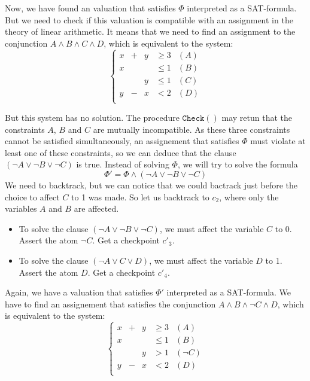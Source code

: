 \documentclass{article}
\newcommand{\icheck}{\mathtt{Check}()}
\begin{document}
Now, we have found an valuation that satisfies $\Phi$ interpreted as a
SAT-formula. But we need to check if this valuation is compatible with an
assignment in the theory of linear arithmetic. It means that we need to find an
assignment to the conjunction $A \wedge B \wedge C \wedge D$, which is equivalent
to the system:
\begin{displaymath}
  \left\{
  \begin{array}{ccccr}
    x  & + & y & \geqslant 3 & (A) \\
    x  &   &   & \leqslant 1 & (B) \\
       &   & y & \leqslant 1 & (C) \\
    y  & - & x & < 2         & (D) \\
  \end{array}
  \right.
\end{displaymath}

But this system has no solution. The procedure $\icheck$ may retun that the
constraints $A$, $B$ and $C$ are mutually incompatible. As these three
constraints cannot be satisfied simultaneously, an assignement that satisfies
$\Phi$ must violate at least one of these constraints, so we can deduce that
the clause $(\neg A \vee \neg B \vee \neg C)$ is true. Instead of solving
$\Phi$, we will try to solve the formula
$$\Phi' = \Phi \wedge (\neg A \vee \neg B \vee \neg C)$$
We need to backtrack, but we can notice that we could bactrack just before
the choice to affect $C$ to 1 was made. So let us backtrack to $c_2$, where
only the variables $A$ and $B$ are affected.

\begin{itemize}
  \item To solve the clause $(\neg A \vee \neg B \vee \neg C)$, we must affect
    the variable $C$ to 0. Assert the atom $\neg C$. Get a checkpoint $c'_3$.
  \item To solve the clause $(\neg A \vee C \vee D)$, we must affect the
    variable $D$ to 1. Assert the atom $D$. Get a checkpoint $c'_4$.
\end{itemize}

Again, we have a valuation that satisfies $\Phi'$ interpreted as a
SAT-formula. We have to find an assignement that satisfies the conjunction
$A \wedge B \wedge \neg C \wedge D$, which is equivalent to the system:
\begin{displaymath}
  \left\{
  \begin{array}{ccccr}
    x  & + & y & \geqslant 3 & (A) \\
    x  &   &   & \leqslant 1 & (B) \\
       &   & y & > 1         & (\neg C) \\
    y  & - & x & < 2         & (D) \\
  \end{array}
  \right.
\end{displaymath}
\end{document}

